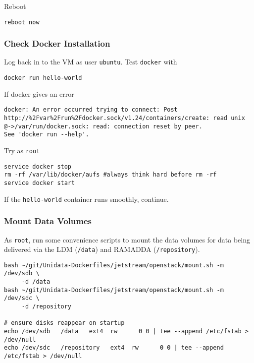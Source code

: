 \documentclass[onecolumn,9pt]{article}
\begin{document}
Reboot

\lstset{frame=lines,basicstyle=\footnotesize,numbers=left,numberstyle=\tiny,language=:eval,label= ,caption= ,captionpos=b}
\begin{lstlisting}
reboot now
\end{lstlisting}

\subsubsection{Check Docker Installation}
\label{sec:orgheadline17}

Log back in to the VM as user \texttt{ubuntu}. Test \texttt{docker} with

\lstset{frame=lines,basicstyle=\footnotesize,numbers=left,numberstyle=\tiny,language=sh,label= ,caption= ,captionpos=b}
\begin{lstlisting}
docker run hello-world
\end{lstlisting}

If docker gives an error

\begin{verbatim}
docker: An error occurred trying to connect: Post http://%2Fvar%2Frun%2Fdocker.sock/v1.24/containers/create: read unix @->/var/run/docker.sock: read: connection reset by peer.
See 'docker run --help'.
\end{verbatim}

Try as \texttt{root}

\lstset{frame=lines,basicstyle=\footnotesize,numbers=left,numberstyle=\tiny,language=sh,label= ,caption= ,captionpos=b}
\begin{lstlisting}
service docker stop
rm -rf /var/lib/docker/aufs #always think hard before rm -rf
service docker start
\end{lstlisting}

If the \texttt{hello-world} container runs smoothly, continue.

\subsubsection{Mount Data Volumes}
\label{sec:orgheadline18}

As \texttt{root}, run some convenience scripts to mount the data volumes for data being delivered via the LDM (\texttt{/data}) and RAMADDA (\texttt{/repository}).

\lstset{frame=lines,basicstyle=\footnotesize,numbers=left,numberstyle=\tiny,language=sh,label= ,caption= ,captionpos=b}
\begin{lstlisting}
bash ~/git/Unidata-Dockerfiles/jetstream/openstack/mount.sh -m /dev/sdb \
     -d /data
bash ~/git/Unidata-Dockerfiles/jetstream/openstack/mount.sh -m /dev/sdc \
     -d /repository

# ensure disks reappear on startup
echo /dev/sdb   /data   ext4  rw      0 0 | tee --append /etc/fstab > /dev/null
echo /dev/sdc   /repository   ext4  rw      0 0 | tee --append /etc/fstab > /dev/null
\end{lstlisting}
\end{document}
